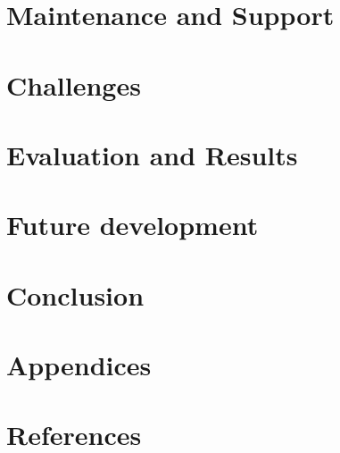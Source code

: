 \documentclass{article}
\begin{document}
\section{Maintenance and Support}

\section{Challenges}

\section{Evaluation and Results}

\section{Future development}

\section{Conclusion}

\section{Appendices}

\section{References}
\end{document}
